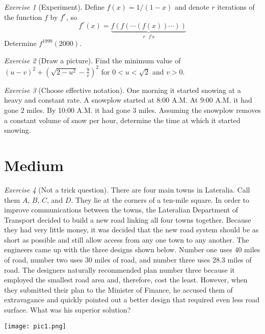 \documentclass{article}
\theoremstyle{definition}
\theoremstyle{remark}
\newtheorem{exercise}{Exercise}
\begin{document}
\begin{exercise}[Experiment]
Define $f(x)=1/(1-x)$ and denote $r$ iterations of the function $f$ by $f^r$, so \[f^r(x)=\underbrace{f(f(\cdots(f(x))\cdots))}_{r\text{ $f$'s}} \] Determine $f^{1999}(2000)$.
\end{exercise}

\begin{exercise}[Draw a picture]
Find the minimum value of $(u-v)^2+(\sqrt{2-u^2}-\frac{9}{v})^2$ for $0<u<\sqrt{2}$ and $v>0$.
\end{exercise}

\begin{exercise}[Choose effective notation]
One morning it started snowing at a heavy and constant rate. A snowplow started at 8:00 A.M. At 9:00 A.M. it had gone $2$ miles. By 10:00 A.M. it had gone $3$ miles. Assuming the snowplow removes a constant volume of snow per hour, determine the time at which it started snowing.
\end{exercise}

\section{Medium}

\begin{exercise}[Not a trick question]
There are four main towns in Lateralia. Call them $A$, $B$, $C$, and $D$. They lie at the corners of a ten-mile square. In order to improve communications between the towns, the Lateralian Department of Transport decided to build a new road linking all four towns together. Because they had very little money, it was decided that the new road system should be as short as possible and still allow access from any one town to any another. The engineers came up with the three designs shown below. Number one uses $40$ miles of road, number two uses $30$ miles of road, and number three uses $28.3$ miles of road. The designers naturally recommended plan number three because it employed the smallest road area and, therefore, cost the least. However, when they submitted their plan to the Minister of Finance, he accused them of extravagance and quickly pointed out a better design that required even less road surface. What was his superior solution?

\begin{center}
\texttt{[image: pic1.png]}
\end{center}
\end{exercise}
\end{document}
